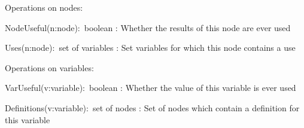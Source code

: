 Operations on nodes:
\begin{tightdesc}
\item[NodeUseful(n:node):~boolean]
:	Whether the results of this node are ever used
\item[Uses(n:node):~set of variables]
:	Set variables for which this node contains a use
\end{tightdesc}

Operations on variables:
\begin{tightdesc}
\item[VarUseful(v:variable):~boolean]
:	Whether the value of this variable is ever used
\item[Definitions(v:variable):~set of nodes]
:	Set of nodes which contain a definition for this variable
\end{tightdesc}
